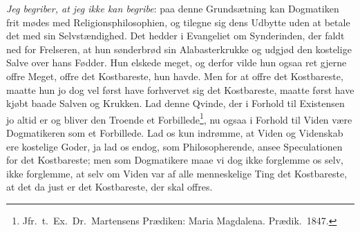 \emph{Jeg begriber, at jeg ikke kan begribe}: paa denne
Grundsætning kan Dogmatiken frit mødes med Religionsphilosophien,
og tilegne sig dens Udbytte uden at betale det med sin
Selvstændighed. Det hedder i Evangeliet om Synderinden, der faldt
ned for Frelseren, at hun sønderbrød sin Alabasterkrukke og udgjød
den kostelige Salve over hans Fødder. Hun elskede meget, og derfor
vilde hun ogsaa ret gjerne offre Meget, offre det Kostbareste, hun
havde. Men for at offre det Kostbareste, maatte hun jo dog vel
først have forhvervet sig det Kostbareste, maatte først have kjøbt
baade Salven og Krukken. Lad denne Qvinde, der i Forhold til
Existensen jo altid er og bliver den Troende et
Forbillede\footnote{Jfr.\ t.\ Ex.\ Dr.\ Martensens Prædiken: Maria
Magdalena. Prædik.\ 1847.}, nu ogsaa i Forhold til Viden være
Dogmatikeren som et Forbillede. Lad os kun indrømme, at Viden og
Videnskab ere kostelige Goder, ja lad os endog, som
Philosopherende, ansee Speculationen for det Kostbareste; men som
Dogmatikere maae vi dog ikke forglemme os
 selv, ikke forglemme, at selv om Viden var af alle menneskelige
Ting det Kostbareste, at det da just er det Kostbareste, der skal
offres.


